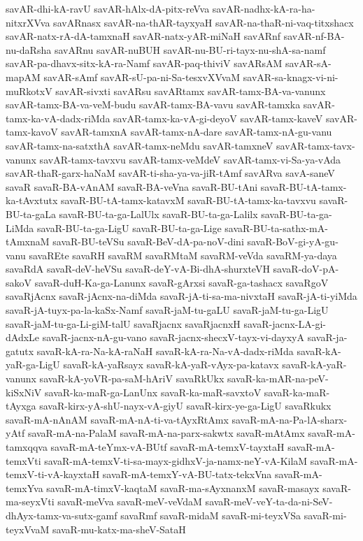 {savAR-dhi-kA-ravU
savAR-hAlx-dA-pitx-reVva
savAR-nadhx-kA-ra-ha-nitxrXVva
savARnasx
savAR-na-thAR-tayxyaH
savAR-na-thaR-ni-vaq-titxshacx
savAR-natx-rA-dA-tamxnaH
savAR-natx-yAR-miNaH
savARnf
savAR-nf-BA-nu-daRsha
savARnu
savAR-nuBUH
savAR-nu-BU-ri-tayx-nu-shA-sa-namf
savAR-pa-dhavx-sitx-kA-ra-Namf
savAR-paq-thiviV
savARsAM
savAR-sA-mapAM
savAR-sAmf
savAR-sU-pa-ni-Sa-tesxvXVvaM
savAR-sa-knagx-vi-ni-muRkotxV
savAR-sivxti
savARsu
savARtamx
savAR-tamx-BA-va-vanunx
savAR-tamx-BA-va-veM-budu
savAR-tamx-BA-vavu
savAR-tamxka
savAR-tamx-ka-vA-dadx-riMda
savAR-tamx-ka-vA-gi-deyoV
savAR-tamx-kaveV
savAR-tamx-kavoV
savAR-tamxnA
savAR-tamx-nA-dare
savAR-tamx-nA-gu-vanu
savAR-tamx-na-satxthA
savAR-tamx-neMdu
savAR-tamxneV
savAR-tamx-tavx-vanunx
savAR-tamx-tavxvu
savAR-tamx-veMdeV
savAR-tamx-vi-Sa-ya-vAda
savAR-thaR-garx-haNaM
savAR-ti-sha-ya-va-jiR-tAmf
savARva
savA-saneV
savaR
savaR-BA-vAnAM
savaR-BA-veVna
savaR-BU-tAni
savaR-BU-tA-tamx-ka-tAvxtutx
savaR-BU-tA-tamx-katavxM
savaR-BU-tA-tamx-ka-tavxvu
savaR-BU-ta-gaLa
savaR-BU-ta-ga-LalUlx
savaR-BU-ta-ga-Lalilx
savaR-BU-ta-ga-LiMda
savaR-BU-ta-ga-LigU
savaR-BU-ta-ga-Lige
savaR-BU-ta-sathx-mA-tAmxnaM
savaR-BU-teVSu
savaR-BeV-dA-pa-noV-dini
savaR-BoV-gi-yA-gu-vanu
savaREte
savaRH
savaRM
savaRMtaM
savaRM-veVda
savaRM-ya-daya
savaRdA
savaR-deV-heVSu
savaR-deY-vA-Bi-dhA-shurxteVH
savaR-doV-pA-sakoV
savaR-duH-Ka-ga-Lanunx
savaR-gArxsi
savaR-ga-tashacx
savaRgoV
savaRjAcnx
savaR-jAcnx-na-diMda
savaR-jA-ti-sa-ma-nivxtaH
savaR-jA-ti-yiMda
savaR-jA-tuyx-pa-la-kaSx-Namf
savaR-jaM-tu-gaLU
savaR-jaM-tu-ga-LigU
savaR-jaM-tu-ga-Li-giM-talU
savaRjacnx
savaRjacnxH
savaR-jacnx-LA-gi-dAdxLe
savaR-jacnx-nA-gu-vano
savaR-jacnx-shecxV-tayx-vi-dayxyA
savaR-ja-gatutx
savaR-kA-ra-Na-kA-raNaH
savaR-kA-ra-Na-vA-dadx-riMda
savaR-kA-yaR-ga-LigU
savaR-kA-yaRsayx
savaR-kA-yaR-vAyx-pa-katavx
savaR-kA-yaR-vanunx
savaR-kA-yoVR-pa-saM-hAriV
savaRkUkx
savaR-ka-mAR-na-peV-kiSxNiV
savaR-ka-maR-ga-LanUnx
savaR-ka-maR-savxtoV
savaR-ka-maR-tAyxga
savaR-kirx-yA-shU-nayx-vA-giyU
savaR-kirx-ye-ga-LigU
savaRkukx
savaR-mA-nAnAM
savaR-mA-nA-ti-va-tAyxRtAmx
savaR-mA-na-Pa-lA-sharx-yAtf
savaR-mA-na-PalaM
savaR-mA-na-parx-sakwtx
savaR-mAtAmx
savaR-mA-tamxqqva
savaR-mA-teYmx-vA-BUtf
savaR-mA-temxV-tayxtaH
savaR-mA-temxVti
savaR-mA-temxV-ti-sa-mayx-gidhxV-ja-namx-neY-vA-KilaM
savaR-mA-temxV-ti-vA-kayxtaH
savaR-mA-temxY-vA-BU-tatx-tekxVna
savaR-mA-temxYva
savaR-mA-timxV-kaqtaM
savaR-ma-sAyxnanxM
savaR-masayx
savaR-ma-seyxVti
savaR-meVva
savaR-meV-veVdaM
savaR-meV-veY-ta-da-ni-SeV-dhAyx-tamx-va-sutx-gamf
savaRmf
savaR-midaM
savaR-mi-teyxVSa
savaR-mi-teyxVvaM
savaR-mu-katx-ma-sheV-SataH
}
